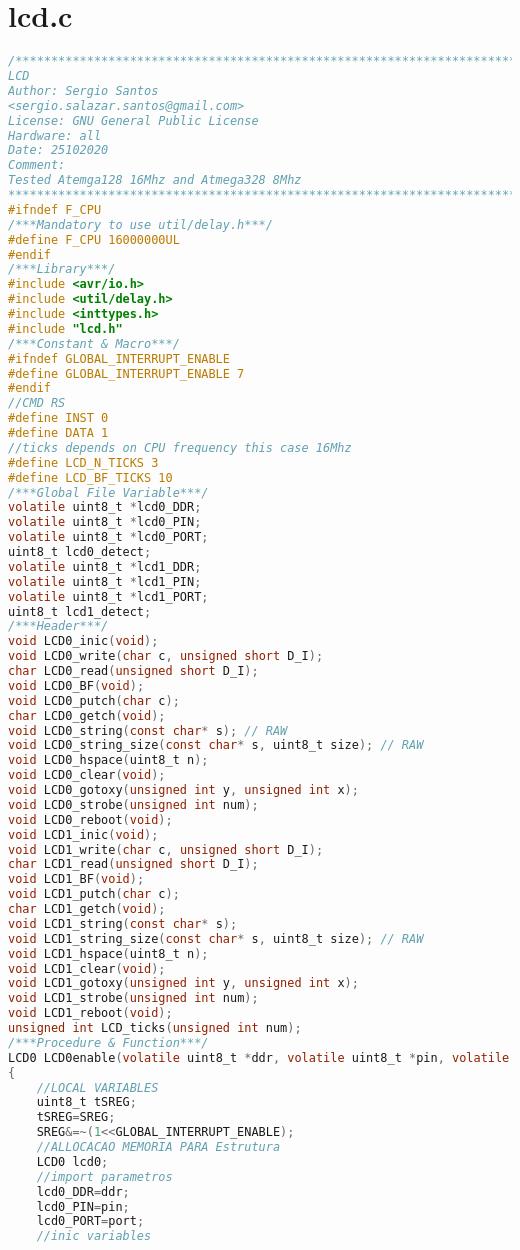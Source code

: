\chapter{lcd.c}
\begin{lstlisting}[language=C, caption={lcd.c}, label=lcd-c, captionpos=b]
/*************************************************************************
LCD
Author: Sergio Santos 
<sergio.salazar.santos@gmail.com>
License: GNU General Public License
Hardware: all
Date: 25102020
Comment:
Tested Atemga128 16Mhz and Atmega328 8Mhz                    
************************************************************************/
#ifndef F_CPU
/***Mandatory to use util/delay.h***/
#define F_CPU 16000000UL
#endif
/***Library***/
#include <avr/io.h>
#include <util/delay.h>
#include <inttypes.h>
#include "lcd.h"
/***Constant & Macro***/
#ifndef GLOBAL_INTERRUPT_ENABLE
#define GLOBAL_INTERRUPT_ENABLE 7
#endif
//CMD RS
#define INST 0
#define DATA 1
//ticks depends on CPU frequency this case 16Mhz
#define LCD_N_TICKS 3
#define LCD_BF_TICKS 10
/***Global File Variable***/
volatile uint8_t *lcd0_DDR;
volatile uint8_t *lcd0_PIN;
volatile uint8_t *lcd0_PORT;
uint8_t lcd0_detect;
volatile uint8_t *lcd1_DDR;
volatile uint8_t *lcd1_PIN;
volatile uint8_t *lcd1_PORT;
uint8_t lcd1_detect;
/***Header***/
void LCD0_inic(void);
void LCD0_write(char c, unsigned short D_I);
char LCD0_read(unsigned short D_I);
void LCD0_BF(void);
void LCD0_putch(char c);
char LCD0_getch(void);
void LCD0_string(const char* s); // RAW
void LCD0_string_size(const char* s, uint8_t size); // RAW
void LCD0_hspace(uint8_t n);
void LCD0_clear(void);
void LCD0_gotoxy(unsigned int y, unsigned int x);
void LCD0_strobe(unsigned int num);
void LCD0_reboot(void);
void LCD1_inic(void);
void LCD1_write(char c, unsigned short D_I);
char LCD1_read(unsigned short D_I);
void LCD1_BF(void);
void LCD1_putch(char c);
char LCD1_getch(void);
void LCD1_string(const char* s);
void LCD1_string_size(const char* s, uint8_t size); // RAW
void LCD1_hspace(uint8_t n);
void LCD1_clear(void);
void LCD1_gotoxy(unsigned int y, unsigned int x);
void LCD1_strobe(unsigned int num);
void LCD1_reboot(void);
unsigned int LCD_ticks(unsigned int num);
/***Procedure & Function***/
LCD0 LCD0enable(volatile uint8_t *ddr, volatile uint8_t *pin, volatile uint8_t *port)
{
	//LOCAL VARIABLES
	uint8_t tSREG;
	tSREG=SREG;
	SREG&=~(1<<GLOBAL_INTERRUPT_ENABLE);
	//ALLOCACAO MEMORIA PARA Estrutura
	LCD0 lcd0;
	//import parametros
	lcd0_DDR=ddr;
	lcd0_PIN=pin;
	lcd0_PORT=port;
	//inic variables

\end{lstlisting}
